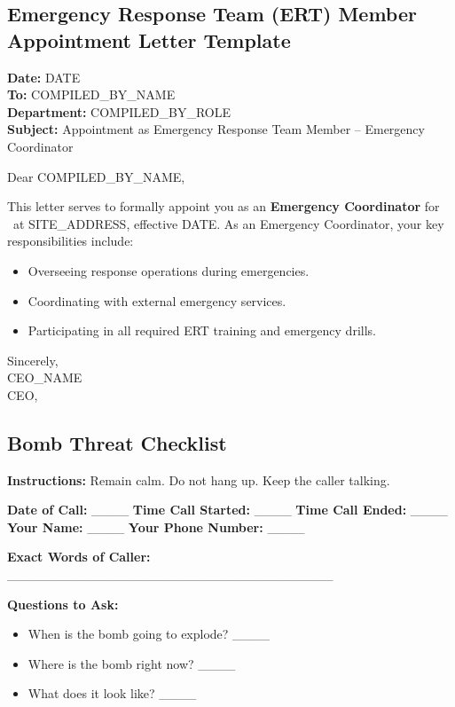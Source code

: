 \documentclass[11pt]{article}
\newcommand{\issueDate}{{{DATE}}}
\newcommand{\siteAddress}{{{SITE_ADDRESS}}}
\newcommand{\compilerName}{{{COMPILED_BY_NAME}}}
\newcommand{\compilerRole}{{{COMPILED_BY_ROLE}}}
\begin{document}
\subsection*{Emergency Response Team (ERT) Member Appointment Letter Template}

\textbf{Date:} \issueDate \\
\textbf{To:} \compilerName \\
\textbf{Department:} \compilerRole \\
\textbf{Subject:} Appointment as Emergency Response Team Member – Emergency Coordinator

Dear \compilerName,

This letter serves to formally appoint you as an \textbf{Emergency Coordinator} for \clientName\ at \siteAddress, effective \issueDate. As an Emergency Coordinator, your key responsibilities include:
\begin{itemize}
    \item Overseeing response operations during emergencies.
    \item Coordinating with external emergency services.
    \item Participating in all required ERT training and emergency drills.
\end{itemize}

Sincerely,\\
{{CEO_NAME}}\\
CEO, \clientName

\subsection*{Bomb Threat Checklist}

\textbf{Instructions:} Remain calm. Do not hang up. Keep the caller talking.

\textbf{Date of Call:} \_\_\_\_ \textbf{Time Call Started:} \_\_\_\_ \textbf{Time Call Ended:} \_\_\_\_ \\
\textbf{Your Name:} \_\_\_\_ \textbf{Your Phone Number:} \_\_\_\_

\textbf{Exact Words of Caller:}\\
\_\_\_\_\_\_\_\_\_\_\_\_\_\_\_\_\_\_\_\_\_\_\_\_\_\_\_\_\_\_\_\_\_\_\_

\textbf{Questions to Ask:}
\begin{itemize}
    \item When is the bomb going to explode? \_\_\_\_
    \item Where is the bomb right now? \_\_\_\_
    \item What does it look like? \_\_\_\_
\end{itemize}
\end{document}
